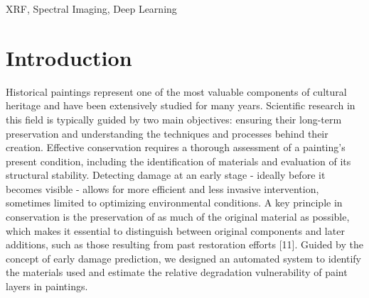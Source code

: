 \documentclass[conference]{IEEEtran}
\begin{document}
\begin{abstract}
This paper presents the design of an automated pipeline for chemical vulnerability assessment of canvas paintings from XRF spectral imaging. The design is based on the recognition of the materials used (from XRF data) and on a literature-grounded composite index that aggregates published degradation mechanisms over the recovered element maps. The pipeline that processes XRF spectra and, for each element, calculates the signal intensity by integrating within a window around the corresponding peak, with the linearly interpolated background below the peak subtracted, was developed. The two-dimensional maps of the elements (calcium, titanium, iron, copper, and lead-single emission line) were created using the resulting peak intensities. The Pearson correlation coefficients were calculated for two independent scans on detector 10264 to evaluate the reproducibility of the inputs. The coefficients for relevant elements (Ca, Ti, Fe, Cu, Pb) achieve r > 0.98, confirming excellent quantitative reproducibility and that the instrumental setup remains stable over time. The system chains self-supervised denoising, physics-based element extraction, NMF decomposition, a literature-grounded CVI, and SAM-based region segmentation - requiring no expert-labeled training data. Thirteen segments were automatically identified by SAM, and six per-region mean CVI values for the highest-risk segments were labeled. The whole procedure typically requires extensive expert analysis, while using this pipeline, the process takes approximately 70 seconds (on an Intel Core i5-12450H with 16GB RAM), for the 7200-spectrum dataset; runtime scales approximately linearly with pixel count.
\end{abstract}

\begin{IEEEkeywords}
	XRF, Spectral Imaging,  Deep Learning 
\end{IEEEkeywords}

\section{Introduction}
Historical paintings represent one of the most valuable components of cultural heritage and have been extensively studied for many years. Scientific research in this field is typically guided by two main objectives: ensuring their long-term preservation and understanding the techniques and processes behind their creation. Effective conservation requires a thorough assessment of a painting’s present condition, including the identification of materials and evaluation of its structural stability. Detecting damage at an early stage - ideally before it becomes visible - allows for more efficient and less invasive intervention, sometimes limited to optimizing environmental conditions. A key principle in conservation is the preservation of as much of the original material as possible, which makes it essential to distinguish between original components and later additions, such as those resulting from past restoration efforts [11]. Guided by the concept of early damage prediction, we designed an automated system to identify the materials used and estimate the relative degradation vulnerability of paint layers in paintings.
\end{document}
